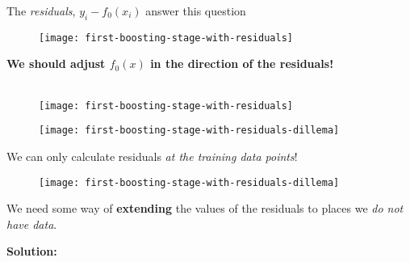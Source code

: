 \begin{frame}
The \textit{residuals}, $y_i - f_0(x_i)$ answer this question

  \begin{figure}
    \texttt{[image: first-boosting-stage-with-residuals]}
  \end{figure}
\end{frame}
%

\begin{frame}
  \begin{center}
    \textbf{We should adjust $f_0(x)$ in the direction of the residuals!}\\~\\
  \end{center}


  \begin{figure}
    \texttt{[image: first-boosting-stage-with-residuals]}
  \end{figure}
  
\end{frame}
%

\begin{frame}

  \begin{figure}
    \texttt{[image: first-boosting-stage-with-residuals-dillema]}
  \end{figure}
  
\end{frame}
%

\begin{frame}
We can only calculate residuals \textit{at the training data points}!

  \begin{figure}
    \texttt{[image: first-boosting-stage-with-residuals-dillema]}
  \end{figure}

We need some way of \textbf{extending} the values of the residuals to places we \textit{do not have data}.
\end{frame}
%

\begin{frame}
\textbf{Solution:}\\~\\


\end{frame}
%

